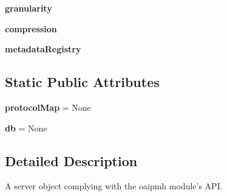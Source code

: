\begin{DoxyCompactItemize}
\item 
\hypertarget{classcheshire3_1_1web_1_1oaipmh_handler_1_1_cheshire3_oai_server_a09c7db15408dc6ec463e9d5880be4b9c}{{\bfseries granularity}}\label{classcheshire3_1_1web_1_1oaipmh_handler_1_1_cheshire3_oai_server_a09c7db15408dc6ec463e9d5880be4b9c}

\item 
\hypertarget{classcheshire3_1_1web_1_1oaipmh_handler_1_1_cheshire3_oai_server_a72adab8f392c2d1853a91556501b4586}{{\bfseries compression}}\label{classcheshire3_1_1web_1_1oaipmh_handler_1_1_cheshire3_oai_server_a72adab8f392c2d1853a91556501b4586}

\item 
\hypertarget{classcheshire3_1_1web_1_1oaipmh_handler_1_1_cheshire3_oai_server_afa5acb3eeaae482c0d3afe200c851f21}{{\bfseries metadata\-Registry}}\label{classcheshire3_1_1web_1_1oaipmh_handler_1_1_cheshire3_oai_server_afa5acb3eeaae482c0d3afe200c851f21}

\end{DoxyCompactItemize}
\subsection*{Static Public Attributes}
\begin{DoxyCompactItemize}
\item 
\hypertarget{classcheshire3_1_1web_1_1oaipmh_handler_1_1_cheshire3_oai_server_a644af9fcc477b3cd3c1b3faaba02c6f8}{{\bfseries protocol\-Map} = None}\label{classcheshire3_1_1web_1_1oaipmh_handler_1_1_cheshire3_oai_server_a644af9fcc477b3cd3c1b3faaba02c6f8}

\item 
\hypertarget{classcheshire3_1_1web_1_1oaipmh_handler_1_1_cheshire3_oai_server_a49825ed717ab9dbe8744c6f2ef8d0854}{{\bfseries db} = None}\label{classcheshire3_1_1web_1_1oaipmh_handler_1_1_cheshire3_oai_server_a49825ed717ab9dbe8744c6f2ef8d0854}

\end{DoxyCompactItemize}


\subsection{Detailed Description}
\begin{DoxyVerb}A server object complying with the oaipmh module's API.\end{DoxyVerb}
 

